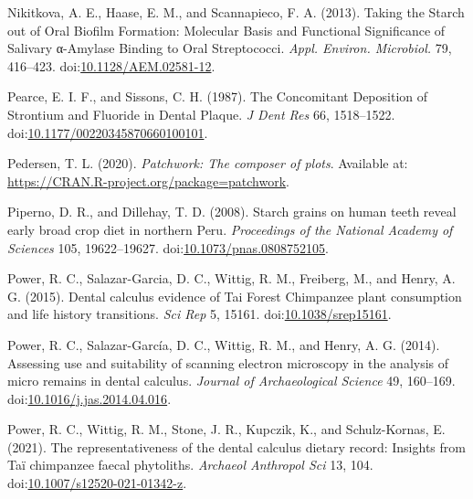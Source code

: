 \documentclass[utf8]{../templates/frontiersSCNS}
\newlength{\cslhangindent}
\newlength{\cslentryspacingunit} %
\newenvironment{CSLReferences}[2] %
 {%
  \setlength{\parindent}{0pt}
  \ifodd #1
  \let\oldpar\par
  \def\par{\hangindent=\cslhangindent\oldpar}
  \fi
  \setlength{\parskip}{#2\cslentryspacingunit}
 }%
 {}
\begin{document}
\begin{CSLReferences}{1}{0}
\leavevmode{}%
Nikitkova, A. E., Haase, E. M., and Scannapieco, F. A. (2013). Taking the {Starch} out of {Oral Biofilm Formation}: {Molecular Basis} and {Functional Significance} of {Salivary} α-{Amylase Binding} to {Oral Streptococci}. \emph{Appl. Environ. Microbiol.} 79, 416--423. doi:\href{https://doi.org/10.1128/AEM.02581-12}{10.1128/AEM.02581-12}.

\leavevmode{}%
Pearce, E. I. F., and Sissons, C. H. (1987). The {Concomitant Deposition} of {Strontium} and {Fluoride} in {Dental Plaque}. \emph{J Dent Res} 66, 1518--1522. doi:\href{https://doi.org/10.1177/00220345870660100101}{10.1177/00220345870660100101}.

\leavevmode{}%
Pedersen, T. L. (2020). \emph{Patchwork: {The} composer of plots}. Available at: \url{https://CRAN.R-project.org/package=patchwork}.

\leavevmode{}%
Piperno, D. R., and Dillehay, T. D. (2008). Starch grains on human teeth reveal early broad crop diet in northern {Peru}. \emph{Proceedings of the National Academy of Sciences} 105, 19622--19627. doi:\href{https://doi.org/10.1073/pnas.0808752105}{10.1073/pnas.0808752105}.

\leavevmode{}%
Power, R. C., Salazar-Garcia, D. C., Wittig, R. M., Freiberg, M., and Henry, A. G. (2015). Dental calculus evidence of {Tai Forest Chimpanzee} plant consumption and life history transitions. \emph{Sci Rep} 5, 15161. doi:\href{https://doi.org/10.1038/srep15161}{10.1038/srep15161}.

\leavevmode{}%
Power, R. C., Salazar-García, D. C., Wittig, R. M., and Henry, A. G. (2014). Assessing use and suitability of scanning electron microscopy in the analysis of micro remains in dental calculus. \emph{Journal of Archaeological Science} 49, 160--169. doi:\href{https://doi.org/10.1016/j.jas.2014.04.016}{10.1016/j.jas.2014.04.016}.

\leavevmode{}%
Power, R. C., Wittig, R. M., Stone, J. R., Kupczik, K., and Schulz-Kornas, E. (2021). The representativeness of the dental calculus dietary record: Insights from {Taï} chimpanzee faecal phytoliths. \emph{Archaeol Anthropol Sci} 13, 104. doi:\href{https://doi.org/10.1007/s12520-021-01342-z}{10.1007/s12520-021-01342-z}.


\end{CSLReferences}
\end{document}
